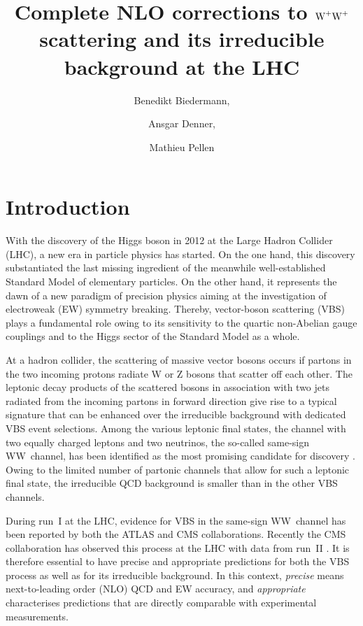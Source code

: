 \documentclass[a4article,11pt]{article}
\title{Complete NLO corrections to $\text{W}^+\text{W}^+$ scattering and its irreducible background at the LHC}
\author{Benedikt Biedermann,}
\author{Ansgar Denner,}
\author{Mathieu Pellen}
\affiliation{%
        Universit\"at W\"urzburg, %
        Institut f\"ur Theoretische Physik und Astrophysik, %
        Emil-Hilb-Weg 22, \linebreak %
        97074 W\"urzburg, %
        Germany%
}
\begin{document}
 


\maketitle
\flushbottom

\newpage

\section{Introduction}
\label{sec:introduction}

With the discovery of the Higgs boson in 2012 at the Large Hadron
Collider (LHC), a new era in particle physics has started. On the one
hand, this discovery substantiated the last missing ingredient of the
meanwhile well-established Standard Model of elementary particles. On
the other hand, it represents the dawn of a new paradigm of precision
physics aiming at the investigation of electroweak (EW) symmetry breaking.
Thereby, vector-boson scattering (VBS) plays a fundamental role owing
to its sensitivity to the quartic non-Abelian gauge couplings and to
the Higgs sector of the Standard Model as a whole.

At a hadron collider, the scattering of massive vector bosons occurs
if partons in the two incoming protons radiate W or Z bosons that
scatter off each other. The leptonic decay products of the scattered
bosons in association with two jets 
radiated from the incoming partons in forward direction 
give rise to a typical signature that can be
enhanced over the irreducible background with dedicated VBS event selections.
Among the various leptonic final states, the channel with two equally
charged leptons and two neutrinos, the so-called same-sign WW~channel,
has been identified as the most promising candidate for discovery
\cite{Campbell:2015vwa,Green:2016trm}. Owing to the limited number of
partonic channels that allow for such a leptonic final state, the
irreducible QCD background is smaller than in the other VBS channels.

During run~I at the LHC, evidence for VBS in the same-sign WW~channel
has been reported by both the ATLAS \cite{Aad:2014zda,Aaboud:2016ffv}
and CMS \cite{Khachatryan:2014sta} collaborations. Recently the CMS
collaboration has observed this process at the LHC with data from
run~II \cite{CMS:2017adb}.  It is therefore essential to have precise
and appropriate predictions for both the VBS process as well as for
its irreducible background.  In this context, \emph{precise} means
next-to-leading order (NLO) QCD and EW accuracy, and
\emph{appropriate} characterises predictions that are directly comparable with
experimental measurements.
\end{document}
